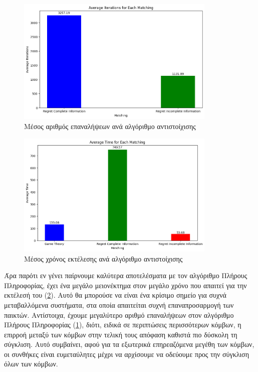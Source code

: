 \begin{figure}[H]
    \centering
    \includegraphics[width=0.85\textwidth]{figures/chapter4/Average_Iterations.png}
    \caption{Μέσος αριθμός επαναλήψεων ανά αλγόριθμο αντιστοίχισης}
    \label{fig29}
\end{figure}

\begin{figure}[H]
    \centering
    \includegraphics[width=0.85\textwidth]{figures/chapter4/Average_Time.png}
    \caption{Μέσος χρόνος εκτέλεσης ανά αλγόριθμο αντιστοίχισης}
    \label{fig30}
\end{figure}

Άρα παρότι εν γένει παίρνουμε καλύτερα αποτελέσματα με τον αλγόριθμο Πλήρους Πληροφορίας, έχει ένα μεγάλο μειονέκτημα στον μεγάλο χρόνο που απαιτεί για την εκτέλεσή του (\ref{fig30}). Αυτό θα μπορούσε να είναι ένα κρίσιμο σημείο για συχνά μεταβαλλόμενα συστήματα, στα οποία απαιτείται συχνή επαναπροσαρμογή των παικτών. Αντίστοιχα, έχουμε μεγαλύτερο αριθμό επαναλήψεων στον αλγόριθμο Πλήρους Πληροφορίας (\ref{fig29}), διότι, ειδικά σε περιπτώσεις περισσότερων κόμβων, η επιρροή μεταξύ των κόμβων στην τελική τους απόφαση καθιστά πιο δύσκολη τη σύγκλιση. Αυτό συμβαίνει, αφού για τα εξωτερικά επηρεαζόμενα μεγέθη των κόμβων, οι συνθήκες είναι ευμεταύλητες μέχρι να αρχίσουμε να οδεύουμε προς την σύγκλιση όλων των κόμβων.

